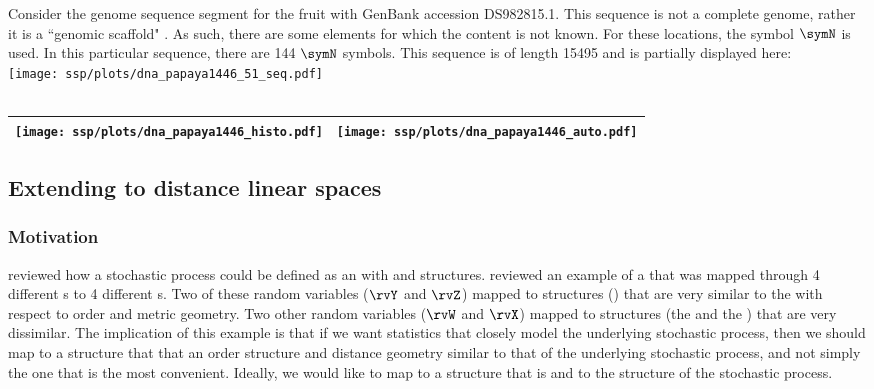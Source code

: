 \begin{example}
\label{ex:dna_papaya}
Consider the genome sequence segment for the fruit
 with GenBank accession DS982815.1.
This sequence is not a complete genome, rather it is a ``genomic scaffold" . 
As such, there are some elements for which the content is not known.
For these locations, the symbol $\symN$ is used.
In this particular sequence, there are 144 $\symN$ symbols.
This sequence is of length 15495 and is partially displayed here:
  \\\texttt{[image: ssp/plots/dna\_papaya1446\_51\_seq.pdf]}\\
     \\\begin{tabular}{|>{\scs}c|>{\scs}c|}
          \hline
          \texttt{[image: ssp/plots/dna\_papaya1446\_histo.pdf]}%
         &\texttt{[image: ssp/plots/dna\_papaya1446\_auto.pdf]}
        \\\hline
     \end{tabular}
\end{example}

\subsection{Extending to distance linear spaces}
\subsubsection{Motivation}
 reviewed how a stochastic process could be defined as an 
with  and  structures.
 reviewed an example of a  
that was mapped through 4 different s to 4 different s.
Two of these random variables ($\rvY$ and $\rvZ$) mapped to structures () that are very similar 
to the  with respect to order and metric geometry.
Two other random variables ($\rvW$ and $\rvX$) mapped to structures 
(the  and the ) that are very dissimilar.
The implication of this example is that if we want statistics that closely model the underlying stochastic process,
then we should map to a structure that that an order structure and distance geometry similar to 
that of the underlying stochastic process, and not simply the one that is the most convenient.
Ideally, we would like to map to a structure that is  
and   to the structure of the stochastic process.

